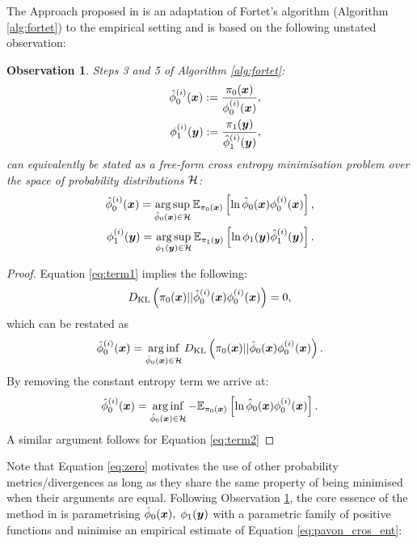 \documentclass[a4paper,12pt,twoside,openright]{report}
\newtheorem{observation}{Observation}
\theoremstyle{definition}
\begin{document}
The Approach proposed in \cite{pavon2018data} is an adaptation of Fortet's algorithm (Algorithm \ref{alg:fortet}) to the empirical setting and is based on the following unstated observation:
\begin{observation}\label{obs:pavon}
Steps 3 and 5 of Algorithm \ref{alg:fortet}:
\begin{align}
    {\hat{\phi}}_0^{(i)}({\bm{x}}) := \frac{\pi_0({\bm{x}})}{\phi_0^{(i)}({\bm{x}})}, \label{eq:term1}\\    \quad \phi_1^{(i)}({\bm{y}}) := \frac{\pi_1({\bm{y}})}{{\hat{\phi}}_1^{(i)}({\bm{y}})} , \label{eq:term2}
\end{align}
can equivalently be stated as a free-form cross entropy minimisation problem over the space of probability distributions ${\mathcal{H}}$:
\begin{align} \label{eq:pavon_cros_ent}
   {\hat{\phi}}_0^{(i)}({\bm{x}})= \operatorname*{arg\,sup}_{{\hat{\phi}}_0({\bm{x}}) \in {\mathcal{H}}} \mathbb{E}_{\pi_0({\bm{x}})} \left[\operatorname{ln} {\hat{\phi}}_0({\bm{x}})   \phi_0^{(i)}({\bm{x}})\right],\\
   \phi_1^{(i)}({\bm{y}})= \operatorname*{arg\,sup}_{\phi_1({\bm{y}}) \in {\mathcal{H}}} \mathbb{E}_{\pi_1({\bm{y}})} \left[\operatorname{ln} \phi_1({\bm{y}})   {\hat{\phi}}_1^{(i)}({\bm{y}})\right].
\end{align}
\end{observation}
\begin{proof}
Equation \ref{eq:term1}  implies the following:
\begin{align}\label{eq:zero}
    D_{\mathrm{KL}}\left(\pi_0({\bm{x}}) || {\hat{\phi}}_0^{(i)}({\bm{x}})   \phi_0^{(i)}({\bm{x}}) \right)  = 0 ,
\end{align} 
which can be restated as
\begin{align}
   {\hat{\phi}}_0^{(i)}({\bm{x}}) = \operatorname*{arg\,inf}_{{\hat{\phi}}_0({\bm{x}})\in \mathcal{H}} D_{\mathrm{KL}}\left(\pi_0({\bm{x}}) || {\hat{\phi}}_0({\bm{x}})   \phi_0^{(i)}({\bm{x}}) \right). 
\end{align} 
By removing the constant entropy term we arrive at:
\begin{align*}
   {\hat{\phi}}_0^{(i)}({\bm{x}})= \operatorname*{arg\,inf}_{{\hat{\phi}}_0({\bm{x}}) \in {\mathcal{H}}} -\mathbb{E}_{\pi_0({\bm{x}})} \left[\operatorname{ln} {\hat{\phi}}_0({\bm{x}})   \phi_0^{(i)}({\bm{x}})\right].
\end{align*}
A similar argument follows for Equation \ref{eq:term2}
\end{proof}
Note that Equation \ref{eq:zero} motivates the use of other probability metrics/divergences as long as they share the same property of being minimised  when their arguments are equal. Following Observation \ref{obs:pavon}, the core essence of the method in \cite{pavon2018data} is parametrising  ${\hat{\phi}}_0({\bm{x}}), \;  \phi_1({\bm{y}}) $ with a parametric family of positive functions and minimise an empirical estimate of Equation \ref{eq:pavon_cros_ent}:
\end{document}
